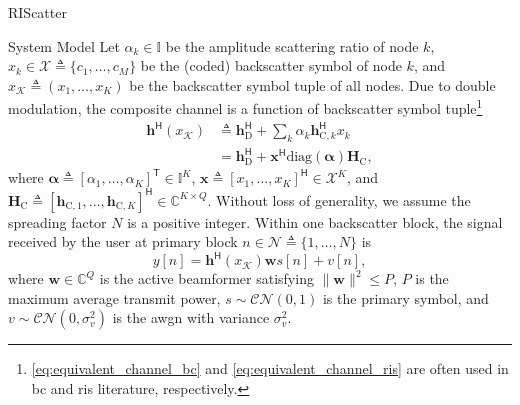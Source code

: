 \begin{section}{RIScatter}
\begin{subsection}{System Model}
		Let $\alpha_k \in \mathbb{I}$ be the amplitude scattering ratio of node $k$, $x_k \in \mathcal{X} \triangleq \{c_1,\ldots,c_M\}$ be the (coded) backscatter symbol of node $k$, and $x_{\mathcal{K}} \triangleq (x_1,\ldots,x_K)$ be the backscatter symbol tuple of all nodes.
		Due to double modulation, the composite channel is a function of backscatter symbol tuple\footnote{\eqref{eq:equivalent_channel_bc} and \eqref{eq:equivalent_channel_ris} are often used in \gls{bc} and \gls{ris} literature, respectively.}
		\begin{subequations}
			\label{eq:equivalent_channel}
			\begin{align}
				\boldsymbol{h}^\mathsf{H}(x_{\mathcal{K}})
				 & \triangleq \boldsymbol{h}_{\text{D}}^\mathsf{H} + \sum_{k} \alpha_k \boldsymbol{h}_{\text{C},k}^\mathsf{H} x_k \label{eq:equivalent_channel_bc}                    \\
				 & = \boldsymbol{h}_{\text{D}}^\mathsf{H} + \boldsymbol{x}^\mathsf{H} \mathrm{diag}(\boldsymbol{\alpha}) \boldsymbol{H}_{\text{C}}, \label{eq:equivalent_channel_ris}
			\end{align}
		\end{subequations}
		where $\boldsymbol{\alpha} \triangleq [\alpha_1,\ldots,\alpha_K]^\mathsf{T} \in \mathbb{I}^{K}$, $\boldsymbol{x} \triangleq [x_1,\ldots,x_K]^\mathsf{H} \in \mathcal{X}^{K}$, and $\boldsymbol{H}_{\text{C}} \triangleq [\boldsymbol{h}_{\text{C},1},\ldots,\boldsymbol{h}_{\text{C},K}]^\mathsf{H} \in \mathbb{C}^{K \times Q}$.
		Without loss of generality, we assume the spreading factor $N$ is a positive integer.
		Within one backscatter block, the signal received by the user at primary block $n \in \mathcal{N} \triangleq \{1,\ldots,N\}$ is
		\begin{equation}
			y[n] = \boldsymbol{h}^\mathsf{H}(x_{\mathcal{K}}) \boldsymbol{w} s[n] + v[n],
			\label{eq:receive_signal}
		\end{equation}
		where $\boldsymbol{w} \in \mathbb{C}^{Q}$ is the active beamformer satisfying $\lVert \boldsymbol{w} \rVert^2 \le P$, $P$ is the maximum average transmit power, $s \sim \mathcal{CN}(0,1)$ is the primary symbol, and $v \sim \mathcal{CN}(0,\sigma_v^2)$ is the \gls{awgn} with variance $\sigma_v^2$.


\end{subsection}
\end{section}
